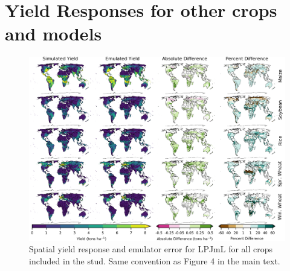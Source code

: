 \documentclass[10pt]{article}
\begin{document}
{{%

\clearpage
\section{Yield Responses for other crops and models}
\begin{figure}[h!]
  \includegraphics[width=\textwidth]{lpjml_grid.png}
  \caption{Spatial yield response and emulator error for LPJmL for all crops included in the stud. Same convention as Figure 4 in the main text.}
  \label{fig:lpjmlrice}
\end{figure}

}}
\end{document}
